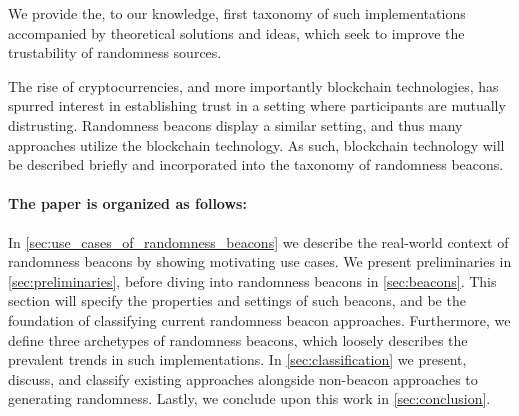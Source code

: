 We provide the, to our knowledge, first taxonomy of such implementations accompanied by theoretical solutions and ideas, which seek to improve the trustability of randomness sources.

The rise of cryptocurrencies, and more importantly blockchain technologies, has spurred interest in establishing trust in a setting where participants are mutually distrusting.
Randomness beacons display a similar setting, and thus many approaches utilize the blockchain technology.
As such, blockchain technology will be described briefly and incorporated into the taxonomy of randomness beacons.

\paragraph{The paper is organized as follows:}
In \cref{sec:use_cases_of_randomness_beacons} we describe the real-world context of randomness beacons by showing motivating use cases.
We present preliminaries in \cref{sec:preliminaries}, before diving into randomness beacons in \cref{sec:beacons}.
This section will specify the properties and settings of such beacons, and be the foundation of classifying current randomness beacon approaches.
Furthermore, we define three archetypes of randomness beacons, which loosely describes the prevalent trends in such implementations.
In \cref{sec:classification} we present, discuss, and classify existing approaches alongside non-beacon approaches to generating randomness. 
Lastly, we conclude upon this work in \cref{sec:conclusion}.


